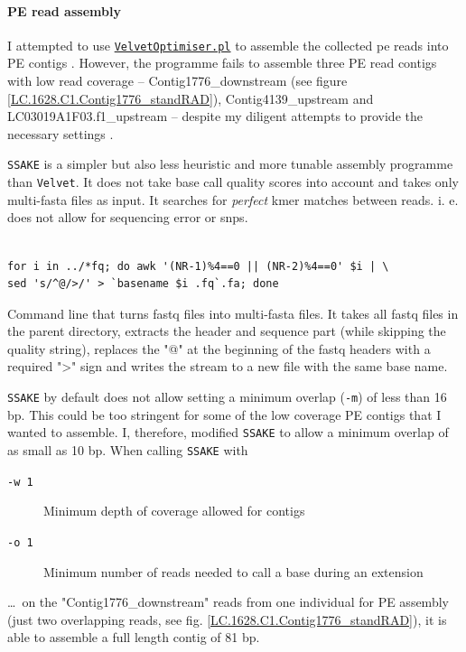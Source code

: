 \documentclass[a4paper,12pt,times,print,index,custombib,custommargin]{PhDThesisPSnPDF}\usepackage[]{graphicx}\usepackage[]{color}
\begin{document}
\paragraph{PE read assembly}\label{ch:PE_read_assembly}
I attempted to use \href{http://www.vicbioinformatics.com/software.velvetoptimiser.shtml}{\texttt{VelvetOptimiser.pl}} to assemble the collected \gls{pe} reads into PE contigs \citep{Zerbino2008}. However, the programme fails to assemble three PE read contigs with low read coverage -- Contig1776\_downstream (see figure  \ref{LC.1628.C1.Contig1776_standRAD}), Contig4139\_upstream and LC03019A1F03.f1\_upstream -- despite my diligent attempts to provide the necessary settings \citep{Zerbino2010,Davey2012,Etter2011}.

\texttt{SSAKE} \citep{Warren2007} is a simpler but also less heuristic and more tunable assembly programme than \texttt{Velvet}. It does not take base call quality scores into account and takes only multi-fasta files as input. It searches for \emph{perfect} \gls{kmer} matches between reads. i. e. does not allow for sequencing error or \glspl{snp}.
%
\begin{cmd}
\captionsetup{type=cmd} %
\begin{Verbatim}[fontsize=\scriptsize, formatcom=\color{darkgray}]

for i in ../*fq; do awk '(NR-1)%4==0 || (NR-2)%4==0' $i | \
sed 's/^@/>/' > `basename $i .fq`.fa; done
\end{Verbatim}
\caption[ fastq files into multi-fasta files]{\small Command line that turns fastq files into multi-fasta files. It takes all fastq files in the parent directory, extracts the header and sequence part (while skipping the quality string), replaces the "@" at the beginning of the fastq headers with a required ">" sign and writes the stream to a new file with the same base name.}
\label{fastq_to_fasta}
\end{cmd}
%
\texttt{SSAKE} by default does not allow setting a minimum overlap (\texttt{-m}) of less than 16 \gls{bp}. This could be too stringent for some of the low coverage PE contigs that I wanted to assemble. I, therefore, modified \texttt{SSAKE} to allow a minimum overlap of as small as 10 bp. When calling \texttt{SSAKE} with
%
\begin{description}
\item[\texttt{-w 1}] \textmd{Minimum depth of coverage allowed for contigs}
\item[\texttt{-o 1}] \textmd{Minimum number of reads needed to call a base during an extension}
\end{description}
%
\dots~on the "Contig1776\_downstream" reads from one individual for PE assembly (just two overlapping reads, see fig. \ref{LC.1628.C1.Contig1776_standRAD}), it is able to assemble a full length contig of 81 bp.
\end{document}
